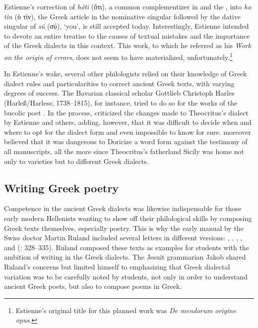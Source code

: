 Estienne’s correction of \textit{hóti} (ὅτι), a common complementizer in  and the , into \textit{ho tìn} (ὁ τὶν), the Greek article in the nominative singular followed by the  dative singular of \textit{sú} (σύ), ‘you’, is still accepted today. Interestingly, Estienne intended to devote an entire treatise to the causes of textual mistakes and the importance of the Greek dialects in this context. This work, to which he referred as his \textit{Work on the origin of errors}, does not seem to have materialized, unfortunately.\footnote{Estienne’s original  title for this planned work was \textit{De mendorum origine opus}.}

In Estienne’s wake, several other philologists relied on their knowledge of Greek dialect rules and particularities to correct ancient Greek texts, with varying degrees of success. The Bavarian classical scholar Gottlieb Christoph Harles (Harleß/Harless; 1738–1815), for instance, tried to do so for the works of the bucolic poet . In the process, \citet[\textsc{xxii–xxiv}]{Harles1780} criticized the changes made to Theocritus’s  dialect by Estienne and others, adding, however, that it was difficult to decide when and where to opt for the dialect form and even impossible to know for sure. \citet[\textsc{xxxi–xxxii}]{Harles1780} moreover believed that it was dangerous to Doricize a word form against the testimony of all manuscripts, all the more since Theocritus’s fatherland Sicily was home not only to  varieties but to different Greek dialects.

\subsection{Writing Greek poetry}

Competence in the ancient Greek dialects was likewise indispensable for those early modern Hellenists wanting to show off their philological skills by composing Greek texts themselves, especially poetry. This is why the early manual by the Swiss doctor Martin Ruland included several letters in different versions: , , , , and  (\citealt{Ruland1556}: 328–335). Ruland composed these texts as examples for students with the ambition of writing in the Greek dialects. The Jesuit grammarian Jakob \citet[35]{Gretser1593} shared Ruland’s concerns but limited himself to emphasizing that Greek dialectal variation was to be carefully noted by students, not only in order to understand ancient Greek poets, but also to compose poems in Greek.

